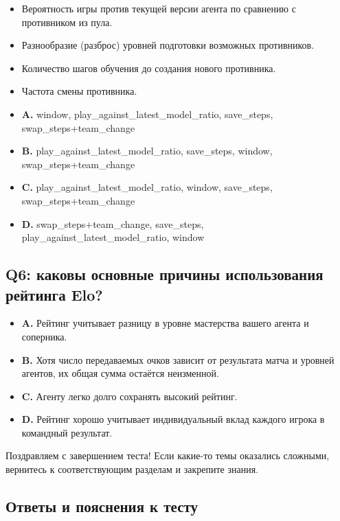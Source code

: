 \documentclass[11pt,a4paper]{article}
\begin{document}
\begin{itemize}
\item
  Вероятность игры против текущей версии агента по сравнению с противником из пула.
\item
  Разнообразие (разброс) уровней подготовки возможных противников.
\item
  Количество шагов обучения до создания нового противника.
\item
  Частота смены противника.
\item
  \textbf{A.} window, play\_against\_latest\_model\_ratio, save\_steps, swap\_steps+team\_change
\item
  \textbf{B.} play\_against\_latest\_model\_ratio, save\_steps, window, swap\_steps+team\_change
\item
  \textbf{C.} play\_against\_latest\_model\_ratio, window, save\_steps, swap\_steps+team\_change
\item
  \textbf{D.} swap\_steps+team\_change, save\_steps, play\_against\_latest\_model\_ratio, window
\end{itemize}

\subsection{Q6: каковы основные причины использования рейтинга Elo?}\label{q6-what-are-the-main-motivations-to-use-a-elo-rating-score}

\begin{itemize}
\tightlist
\item
  \textbf{A.} Рейтинг учитывает разницу в уровне мастерства вашего агента и соперника.
\item
  \textbf{B.} Хотя число передаваемых очков зависит от результата матча и уровней агентов, их общая сумма остаётся неизменной.
\item
  \textbf{C.} Агенту легко долго сохранять высокий рейтинг.
\item
  \textbf{D.} Рейтинг хорошо учитывает индивидуальный вклад каждого игрока в командный результат.
\end{itemize}

Поздравляем с завершением теста! Если какие-то темы оказались сложными, вернитесь к соответствующим разделам и закрепите знания.

\subsection{Ответы и пояснения к тесту}\label{quiz-solutions-and-explanations}
\end{document}
